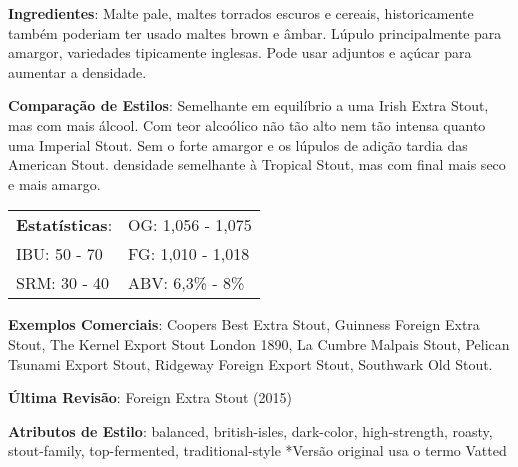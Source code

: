 \textbf{Ingredientes}: Malte pale, maltes torrados escuros e cereais, historicamente também poderiam ter usado maltes brown e âmbar. Lúpulo principalmente para amargor, variedades tipicamente inglesas. Pode usar adjuntos e açúcar para aumentar a densidade.

\textbf{Comparação de Estilos}: Semelhante em equilíbrio a uma Irish Extra Stout, mas com mais álcool. Com teor alcoólico não tão alto nem tão intensa quanto uma Imperial Stout. Sem o forte amargor e os lúpulos de adição tardia das American Stout. densidade semelhante à Tropical Stout, mas com final mais seco e mais amargo.

\begin{tabular}{@{}p{35mm}p{35mm}@{}}
  \textbf{Estatísticas}: & OG: 1,056 - 1,075 \\
  IBU: 50 - 70  & FG: 1,010 - 1,018  \\
  SRM: 30 - 40   & ABV: 6,3\% - 8\%
\end{tabular}

\textbf{Exemplos Comerciais}: Coopers Best Extra Stout, Guinness Foreign Extra Stout, The Kernel Export Stout London 1890, La Cumbre Malpais Stout, Pelican Tsunami Export Stout, Ridgeway Foreign Export Stout, Southwark Old Stout.

\textbf{Última Revisão}: Foreign Extra Stout (2015)

\textbf{Atributos de Estilo}: balanced, british-isles, dark-color, high-strength, roasty, stout-family, top-fermented, traditional-style
*Versão original usa o termo Vatted

